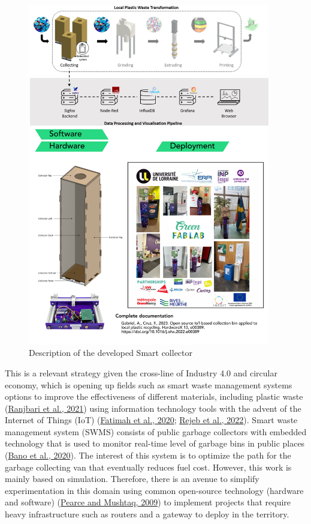 \documentclass[
  11pt,
]{article}
\begin{document}
\begin{figure}[H]

{\centering \includegraphics[width=4.16667in,height=\textheight]{figures/SC/Abstract.png}

}

\caption{\label{fig-smart-collector}Description of the developed Smart
collector}

\end{figure}

This is a relevant strategy given the cross-line of Industry 4.0 and
circular economy, which is opening up fields such as smart waste
management systems options to improve the effectiveness of different
materials, including plastic waste
(\protect\hyperlink{ref-Ranjbari2021}{Ranjbari et al., 2021}) using
information technology tools with the advent of the Internet of Things
(IoT) (\protect\hyperlink{ref-fatimah2020}{Fatimah et al., 2020};
\protect\hyperlink{ref-rejeb2022}{Rejeb et al., 2022}). Smart waste
management system (SWMS) consists of public garbage collectors with
embedded technology that is used to monitor real-time level of garbage
bins in public places (\protect\hyperlink{ref-Bano2020}{Bano et al.,
2020}). The interest of this system is to optimize the path for the
garbage collecting van that eventually reduces fuel cost. However, this
work is mainly based on simulation. Therefore, there is an avenue to
simplify experimentation in this domain using common open-source
technology (hardware and software)
(\protect\hyperlink{ref-Pearce2009}{Pearce and Mushtaq, 2009}) to
implement projects that require heavy infrastructure such as routers and
a gateway to deploy in the territory.
\end{document}
